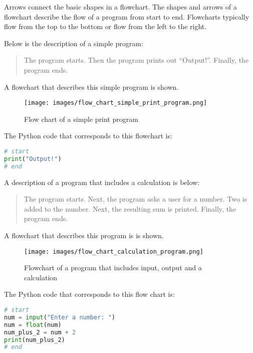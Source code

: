 \documentclass{book}
\makeatletter
\def\maxwidth{\ifdim\Gin@nat@width>\linewidth\linewidth
\else\Gin@nat@width\fi}
\let\Oldincludegraphics\includegraphics
\renewcommand{\includegraphics}[1]{\Oldincludegraphics[width=.8\maxwidth]{#1}}
\makeatother
\begin{document}
Arrows connect the basic shapes in a flowchart. The shapes and arrows of
a flowchart describe the flow of a program from start to end. Flowcharts
typically flow from the top to the bottom or flow from the left to the
right.
    




    
        Below is the description of a simple program:

\begin{quote}
The program starts. Then the program prints out ``Output!''. Finally,
the program ends.
\end{quote}

A flowchart that describes this simple program is shown.

\begin{figure}
\centering
\texttt{[image: images/flow\_chart\_simple\_print\_program.png]}
\caption{Flow chart of a simple print program}
\end{figure}

The Python code that corresponds to this flowchart is:

\begin{lstlisting}[language=Python]
# start
print("Output!")
# end
\end{lstlisting}
    




    
        A description of a program that includes a calculation is below:

\begin{quote}
The program starts. Next, the program asks a user for a number. Two is
added to the number. Next, the resulting sum is printed. Finally, the
program ends.
\end{quote}

A flowchart that describes this program is is shown.

\begin{figure}
\centering
\texttt{[image: images/flow\_chart\_calculation\_program.png]}
\caption{Flowchart of a program that includes input, output and a
calculation}
\end{figure}

The Python code that corresponds to this flow chart is:

\begin{lstlisting}[language=Python]
# start
num = input("Enter a number: ")
num = float(num)
num_plus_2 = num + 2
print(num_plus_2)
# end
\end{lstlisting}
    
\end{document}
